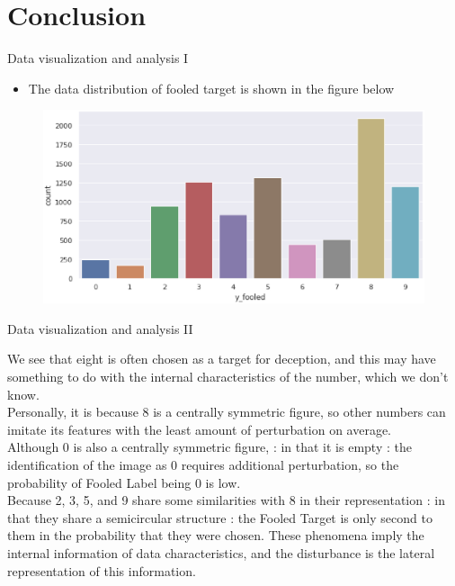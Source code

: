 \documentclass[
 size=14pt,
 paper=smartboard,  %
 mode=present, 		%
 display=slides, 	%
 style=tuliplab,  	%
 pauseslide,
 fleqn,leqno]{powerdot}
\begin{document}
\section{Conclusion}


\begin{slide}{Data visualization and analysis I}
	\begin{itemize}
	\item 	The data distribution of fooled target is shown in the figure below
\end{itemize}

	\begin{figure}[htbp]
	\includegraphics[scale=0.8]{./pic/5.eps}
	\end{figure}

\end{slide}
\begin{slide}{Data visualization and analysis II}
	
	We see that eight is often chosen as a target for deception, and this may have something to do with the internal characteristics of the number, which we don't know.\\
	Personally, it is because 8 is a centrally symmetric figure, so other numbers can imitate its features with the least amount of perturbation on average.\\
	Although 0 is also a centrally symmetric figure, : in that it is empty : the identification of the image as 0 requires additional perturbation, so the probability of Fooled Label being 0 is low.\\
	Because 2, 3, 5, and 9 share some similarities with 8 in their representation : in that they share a semicircular structure : the Fooled Target is only second to them in the probability that they were chosen.
	These phenomena imply the internal information of data characteristics, and the disturbance is the lateral representation of this information.
	
\end{slide}
\end{document}
